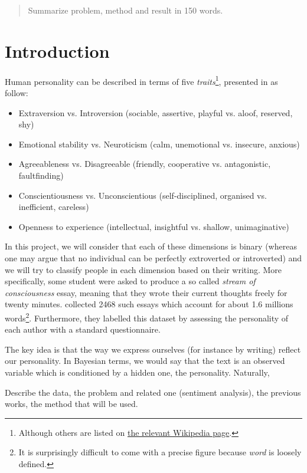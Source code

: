 \begin{abstract}
	Summarize problem, method and result in 150 words.
\end{abstract}
\newpage

\section{Introduction}
Human personality can be described in terms of five \emph{traits}\footnote{Although others are listed on
\href{http://en.wikipedia.org/wiki/Trait\_theory\#List\_of\_personality\_traits}{the
relevant Wikipedia page}.}, presented in \autocite{mairesse2007perso} as follow:
\begin{itemize}
\item Extraversion vs. Introversion (sociable, assertive, playful vs. aloof, reserved, shy)
\item Emotional stability vs. Neuroticism (calm, unemotional vs. insecure, anxious)
\item Agreeableness vs. Disagreeable (friendly, cooperative vs. antagonistic, faultfinding)
\item Conscientiousness vs. Unconscientious (self-disciplined, organised vs. inefficient, careless)
\item Openness to experience (intellectual, insightful vs. shallow, unimaginative)
\end{itemize}

In this project, we will consider that each of these dimensions is binary (whereas one may argue that no individual can be perfectly extroverted or introverted) and we will try to classify people in each dimension based on their writing. More specifically, some student were asked to produce a so called \emph{stream of consciousness} essay, meaning that they wrote their current thoughts freely for twenty minutes. \Textcite{pennebaker1999corpus} collected 2468 such essays which account for about 1.6 millions words\footnote{It is surprisingly difficult to come with a precise figure because \emph{word} is loosely defined.}. Furthermore, they labelled this dataset by assessing the personality of each author with a standard questionnaire.

The key idea is that the way we express ourselves (for instance by writing) reflect our personality. In Bayesian terms, we would say that the text is an observed variable which is conditioned by a hidden one, the personality. Naturally, 

Describe the data, the problem and related one (sentiment analysis), the
previous works\cite{mairesse2007perso}, the method that will be used.

